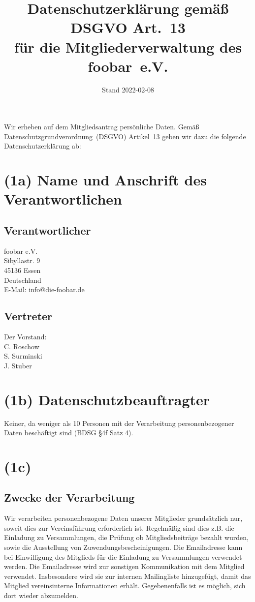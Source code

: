 \documentclass{article}
\title{Datenschutzerklärung gemäß DSGVO Art.~13\\
    für die Mitgliederverwaltung des foobar~e.V.}
\date{Stand 2022-02-08}
\begin{document}
\maketitle

Wir erheben auf dem Mitgliedsantrag persönliche Daten.
Gemäß Datenschutzgrundverordnung~(DSGVO) Artikel~13 geben wir dazu die
folgende Datenschutzerklärung ab:


\section*{(1a) Name und Anschrift des Verantwortlichen}

\subsection*{Verantwortlicher}

foobar e.V.\\
Sibyllastr. 9\\
45136 Essen\\
Deutschland\\[2ex]
E-Mail: info@die-foobar.de


\subsection*{Vertreter}

Der Vorstand:\\[2ex]
C. Roschow\\
S. Surminski\\
J. Stuber


\section*{(1b) Datenschutzbeauftragter}

Keiner, da weniger als 10 Personen mit der Verarbeitung
personenbezogener Daten beschäftigt sind (BDSG §4f Satz 4).


\section*{(1c)}

\subsection*{Zwecke der Verarbeitung}

Wir verarbeiten personenbezogene Daten unserer Mitglieder grundsätzlich
nur, soweit dies zur Vereinsführung erforderlich ist.
Regelmäßig sind dies z.B. die Einladung zu Versammlungen,
die Prüfung ob Mitgliedsbeiträge bezahlt wurden,
sowie die Ausstellung von Zuwendungsbescheinigungen.
%
Die Emailadresse kann bei Einwilligung des Mitglieds für die Einladung
zu Versammlungen verwendet werden.
%
Die Emailadresse wird zur sonstigen Kommunikation mit dem Mitglied
verwendet. Insbesondere wird sie zur internen Mailingliste
hinzugefügt, damit das Mitglied vereinsinterne Informationen erhält.
Gegebenenfalls ist es möglich, sich dort wieder abzumelden.
\end{document}
